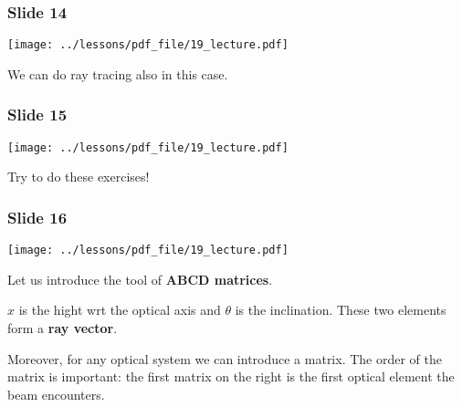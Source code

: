\documentclass[../main/main.tex]{subfiles}
\begin{document}
\subsubsection*{Slide 14}

\begin{minipage}[]{0.5\linewidth}
\centering
\texttt{[image: ../lessons/pdf\_file/19\_lecture.pdf]}
\end{minipage}
\hspace{0.3cm}\vspace{0.3cm}
\begin{minipage}[c]{0.47\linewidth}

We can do ray tracing also in this case.

\end{minipage}

\subsubsection*{Slide 15}

\begin{minipage}[]{0.5\linewidth}
\centering
\texttt{[image: ../lessons/pdf\_file/19\_lecture.pdf]}
\end{minipage}
\hspace{0.3cm}\vspace{0.3cm}
\begin{minipage}[c]{0.47\linewidth}

Try to do these exercises!

\end{minipage}

\subsubsection*{Slide 16}

\begin{minipage}[]{0.5\linewidth}
\centering
\texttt{[image: ../lessons/pdf\_file/19\_lecture.pdf]}
\end{minipage}
\hspace{0.3cm}\vspace{0.3cm}
\begin{minipage}[c]{0.47\linewidth}

Let us introduce the tool of \textbf{ABCD matrices}.

\( x \) is the hight wrt the optical axis and \( \theta  \) is the inclination. These two elements form a \textbf{ray vector}.

Moreover, for any optical system we can introduce a matrix.
The order of the matrix is important: the first matrix on the right is the first optical element the beam encounters.


\end{minipage}
\end{document}
